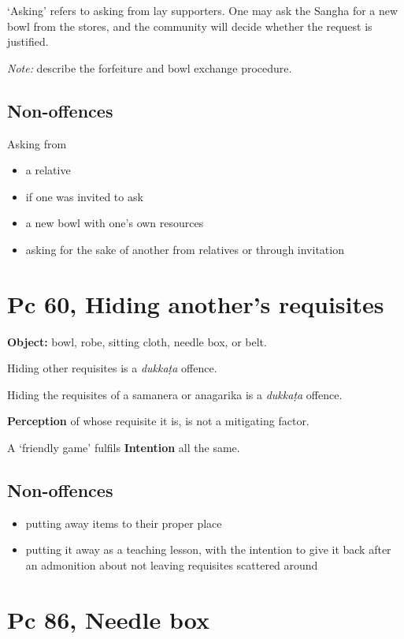 `Asking' refers to asking from lay supporters. One may ask the Sangha
for a new bowl from the stores, and the community will decide whether
the request is justified.

\emph{Note:} describe the forfeiture and bowl exchange procedure.

\subsection{Non-offences}

Asking from

\begin{itemize}
\tightlist
\item
  a relative
\item
  if one was invited to ask
\item
  a new bowl with one's own resources
\item
  asking for the sake of another from relatives or through invitation
\end{itemize}

\section{Pc 60, Hiding another's requisites}

\textbf{Object:} bowl, robe, sitting cloth, needle box, or belt.

Hiding other requisites is a \emph{dukkaṭa} offence.

Hiding the requisites of a samanera or anagarika is a \emph{dukkaṭa}
offence.

\textbf{Perception} of whose requisite it is, is not a mitigating
factor.

A `friendly game' fulfils \textbf{Intention} all the same.

\subsection{Non-offences}

\begin{itemize}
\tightlist
\item
  putting away items to their proper place
\item
  putting it away as a teaching lesson, with the intention to give it
  back after an admonition about not leaving requisites scattered around
\end{itemize}

\section{Pc 86, Needle box}

